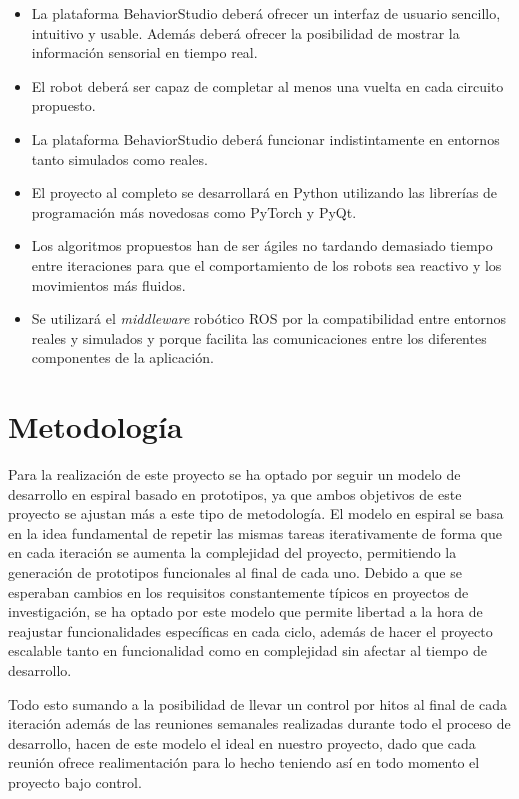 \begin{itemize}
    \item La plataforma BehaviorStudio deberá ofrecer un interfaz de usuario sencillo, intuitivo y usable. Además deberá ofrecer la posibilidad de mostrar la información sensorial en tiempo real.
    \item El robot deberá ser capaz de completar al menos una vuelta en cada circuito propuesto.
    \item La plataforma BehaviorStudio deberá funcionar indistintamente en entornos tanto simulados como reales.
    \item El proyecto al completo se desarrollará en Python utilizando las librerías de programación más novedosas como PyTorch y PyQt.
    \item Los algoritmos propuestos han de ser ágiles no tardando demasiado tiempo entre iteraciones para que el comportamiento de los robots sea reactivo y los movimientos más fluidos.
    \item Se utilizará el \textit{middleware} robótico ROS por la compatibilidad entre entornos reales y simulados y porque facilita las comunicaciones entre los diferentes componentes de la aplicación.
\end{itemize}

\section{Metodología}

Para la realización de este proyecto se ha optado por seguir un modelo de desarrollo en espiral basado en prototipos, ya que ambos objetivos de este proyecto se ajustan más a este tipo de metodología. El modelo en espiral se basa en la idea fundamental de repetir las mismas tareas iterativamente de forma que en cada iteración se aumenta la complejidad del proyecto, permitiendo la generación de prototipos funcionales al final de cada uno. Debido a que se esperaban cambios en los requisitos constantemente típicos en proyectos de investigación, se ha optado por este modelo que permite libertad a la hora de reajustar funcionalidades específicas en cada ciclo, además de hacer el proyecto escalable tanto en funcionalidad como en complejidad sin afectar al tiempo de desarrollo.

Todo esto sumando a la posibilidad de llevar un control por hitos al final de cada iteración además de las reuniones semanales realizadas durante todo el proceso de desarrollo, hacen de este modelo el ideal en nuestro proyecto, dado que cada reunión ofrece realimentación para lo hecho teniendo así en todo momento el proyecto bajo control.

